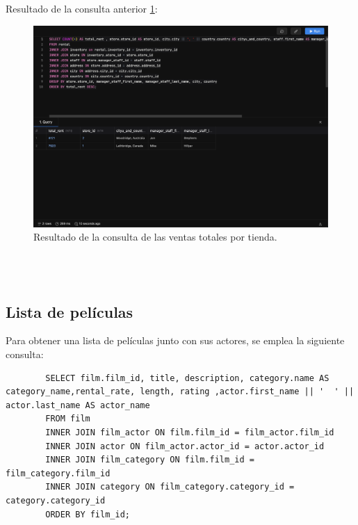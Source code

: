 \documentclass{report}
\begin{document}
	Resultado de la consulta anterior \ref{fig:Exercice-2-2}:

	\begin{figure}[H]
		\centering
		\includegraphics[scale=0.5]{img/Exercice-2.2.2-Comprobation.png}
		\caption{Resultado de la consulta de las ventas totales por tienda.}
		\label{fig:Exercice-2-2}
	\end{figure}

	\\
\\
	
	\subsection{Lista de películas}
	Para obtener una lista de películas junto con sus actores, se emplea la siguiente consulta:

	\begin{verbatim}
		SELECT film.film_id, title, description, category.name AS category_name,rental_rate, length, rating ,actor.first_name || '  ' || actor.last_name AS actor_name
		FROM film
		INNER JOIN film_actor ON film.film_id = film_actor.film_id
		INNER JOIN actor ON film_actor.actor_id = actor.actor_id
		INNER JOIN film_category ON film.film_id = film_category.film_id
		INNER JOIN category ON film_category.category_id = category.category_id
		ORDER BY film_id;
	\end{verbatim}
\end{document}
